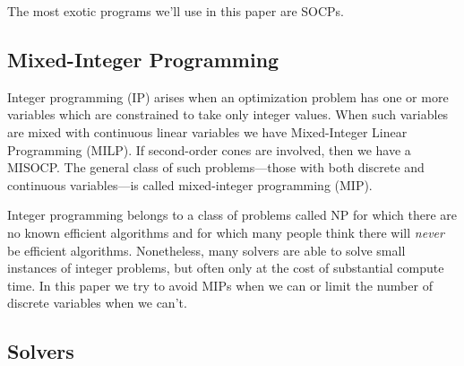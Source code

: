 \documentclass{article}
\begin{document}
The most exotic programs we'll use in this paper are SOCPs. %

\subsection{Mixed-Integer Programming}

Integer programming (IP) arises when an optimization problem has one or more variables which are constrained to take only integer values. When such variables are mixed with continuous linear variables we have Mixed-Integer Linear Programming (MILP). If second-order cones are involved, then we have a MISOCP. The general class of such problems---those with both discrete and continuous variables---is called mixed-integer programming (MIP).

Integer programming belongs to a class of problems called NP for which there are no known efficient algorithms and for which many people think there will \textit{never} be efficient algorithms. Nonetheless, many solvers are able to solve small instances of integer problems, but often only at the cost of substantial compute time. In this paper we try to avoid MIPs when we can or limit the number of discrete variables when we can't. %

\subsection{Solvers}
\end{document}
